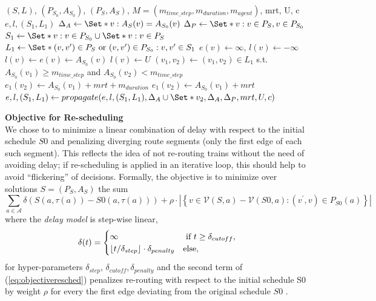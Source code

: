 \documentclass{article}
\DeclarePairedDelimiter{\floor}{\lfloor}{\rfloor}
\begin{document}
\begin{algorithm}
	\caption{$Delta_{perfect}$} \label{algo:Deltaperfect}
	\begin{algorithmic}[1]
		\Require $(S,L)$, $(P_{S_0},A_{S_0})$, $(P_S,A_S)$, $M=(m_{time\_step},m_{duration},m_{agent})$, mrt, U, c
	    \Ensure $e,l,(S_1,L_1)$
	    \State $\Delta_A \leftarrow \Set*{v: A_S(v)=A_{S_0}(v)}$
	    \State $\Delta_P \leftarrow \Set*{v: v\in P_S, v\in P_{S_0}}$
	    \State $S_1 \leftarrow \Set*{v: v\in P_{S_0}} \cup \Set*{v: v\in P_{S}}$
	    \State $L_1 \leftarrow \Set*{(v,v^\prime) \in P_S \textrm{ or } (v,v^\prime) \in P_{S_0}: v,v^\prime \in S_1}$
	        \State $e(v) \leftarrow \infty$, $l(v) \leftarrow -\infty$
	    \EndFor
	        \State $l(v)\leftarrow e(v)\leftarrow A_{S_0}(v)$
	    \EndFor
	        \State $l(v) \leftarrow U$
	    \EndFor
	    \State $(v_1,v_2) \leftarrow (v_1,v_2) \in L_1$ s.t. $A_{S_0}(v_1)\geq m_{time\_step}$ and $A_{S_0}(v_2)<m_{time\_step}$
            \State $e_1(v_2) \leftarrow A_{S_0}(v_1)+mrt+m_{duration}$
        \Else
            \State $e_1(v_2) \leftarrow A_{S_0}(v_1)+mrt$
        \EndIf
        \EndIf
	    \State $e,l,(S_1,L_1) \leftarrow propagate(e,l,(S_1,L_1),\Delta_A \cup \Set*{v_2}, \Delta_A, \Delta_P, mrt, U, c)$
	\end{algorithmic}
\end{algorithm}


\noindent\textbf{Objective for Re-scheduling}
\\
We chose to to minimize a linear combination of delay with respect to the initial schedule $S0$ and penalizing diverging route segments (only the first edge of each such segment). This reflects the idea of not re-routing trains without the need of avoiding delay; if re-scheduling is applied in an iterative loop, this should help to avoid ``flickering'' of decisions.
%
Formally, the objective is to minimize over solutions $S=(P_S,A_S)$  the sum
\begin{equation}
\sum_{a \in \mathcal{A}} \delta\left(S(a,\tau(a)) - S0(a,\tau(a))\right) + \rho \cdot \left|\left\{v \in \mathcal{V}(S,a)-\mathcal{V}(S0,a): (v^\prime,v) \in P_{S0}(a) \right\}\right| \label{eq:objectiveresched}
\end{equation}
where the \emph{delay model} is step-wise linear,
\begin{equation}
\delta(t) =
\begin{cases}
    \infty & \textrm{ if } t \geq \delta_{cutoff},\\
    \floor{t / \delta_{step}} \cdot \delta_{penalty}  & \textrm{else},
\end{cases}
\end{equation}
for hyper-parameters $\delta_{step}$, $\delta_{cutoff}, \delta_{penalty}$
and the second term of (\ref{eq:objectiveresched}) penalizes re-routing with respect to the initial schedule S0 by weight $\rho$ for every the first edge deviating from the original schedule $S0$ .
\end{document}
